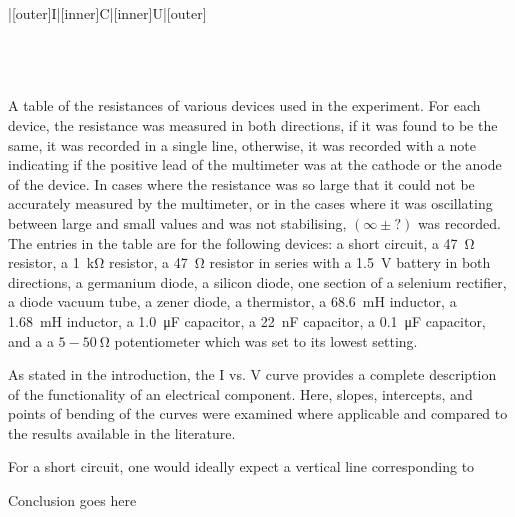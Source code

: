 \begin{paper}
{\begin{papertable}{|[outer]I|[inner]C|[inner]U|[outer]}
\papertableindex{}\\\paperiline
\papertableindex{}\\\paperiline
\papertableindex{}\\\paperiline
\papertableindex{}\\\paperoline
\end{papertable}\vspace{-1.5em}}
{A table of the resistances of various devices used in the experiment.
For each device, the resistance was measured in both directions, if it was found to be the same, it was recorded in a single line,
otherwise, it was recorded with a note indicating if the positive lead of the multimeter was at the cathode or the anode of the device.
In cases where the resistance was so large that it could not be accurately measured by the multimeter, or in the cases where it was oscillating between large and small values and was not stabilising, $(\infty\pm?)$ was recorded.
The entries in the table are for the following devices: a short circuit, a \SI{47}{\ohm} resistor, a \SI{1}{\kilo\ohm} resistor, a \SI{47}{\ohm} resistor in series with a \SI{1.5}{\volt} battery in both directions, a germanium diode, a silicon diode, one section of a selenium rectifier, a diode vacuum tube, a zener diode, a thermistor, a \SI{68.6}{\milli\henry} inductor, a \SI{1.68}{\milli\henry} inductor, a \SI{1.0}{\micro\farad} capacitor, a \SI{22}{\nano\farad} capacitor, a \SI{0.1}{\micro\farad} capacitor, and a a $5-\SI{50}{\ohm}$ potentiometer which was set to its lowest setting.}
	
	
	As stated in the introduction, the I vs. V curve provides a complete description of the functionality of an electrical component. Here, slopes, intercepts, and points of bending of the curves were examined where applicable and compared to the results available in the literature.  
	
	For a short circuit, one would ideally expect a vertical line corresponding to 
	

	Conclusion goes here
	


\end{paper}
